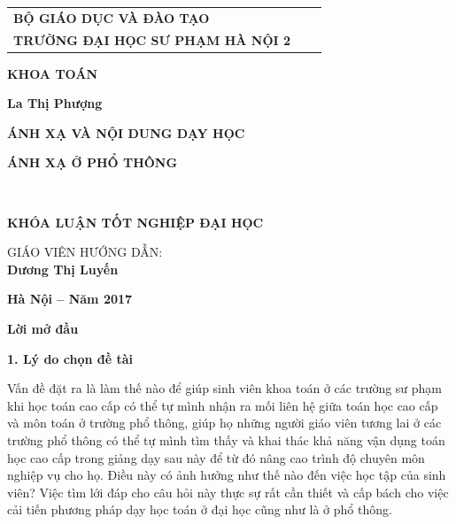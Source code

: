 \documentclass[12pt,oneside,a4paper,reqno]{book}
\begin{document}
\begin{titlepage}
\begin{longtable}{p{4cm}p{2cm}p{7cm}}
\centerline{\bf BỘ GIÁO DỤC VÀ ĐÀO TẠO}\\
\centerline{\bf TRƯỜNG ĐẠI HỌC SƯ PHẠM HÀ NỘI 2}\\

\end{longtable}
\vspace*{2 cm}
\centerline{\large\bf KHOA TOÁN}
\vspace*{2 cm}
\centerline{\large\bf La Thị Phượng}
\vspace*{2cm}
\centerline{\Large\bf ÁNH XẠ VÀ NỘI DUNG DẠY HỌC  }
\centerline{\Large\bf  ÁNH XẠ Ở PHỔ THÔNG}
\vspace*{1cm}
\begin{flushleft}
\hspace*{3.75cm}{\large\bf Chuyên ngành: Đại số}\\
\hspace*{3.75cm}{\large\bf Mã số: ???????}
\end{flushleft}
\vspace*{1cm}
\begin{center}
{\large\bf KHÓA LUẬN TỐT NGHIỆP ĐẠI HỌC}\\
\end{center}
\vspace*{1cm}
\begin{flushright}
GIÁO VIÊN HƯỚNG DẪN:\\
\textbf{Dương Thị Luyến}
\end{flushright}
\vfill
\centerline{\large\bf Hà Nội -- Năm 2017}
\vspace*{0.3cm}
\end{titlepage}

\large
\pagestyle{fancy}
\setcounter{page}{1}
\tableofcontents
\newpage
{}
\vspace*{0.2cm}
\centerline{\Large\bf Lời mở đầu}
\vspace*{0.5cm}
\textbf{1. Lý do chọn đề tài}


Vấn đề đặt ra là làm thế nào để giúp sinh viên khoa toán ở các trường sư phạm khi học toán cao cấp có thể tự mình nhận ra mối liên hệ giữa toán học cao cấp và môn toán ở trường phổ thông, giúp họ những người giáo viên tương lai ở các trường phổ thông có thể tự mình tìm thấy và khai thác khả năng vận dụng toán học cao cấp trong giảng dạy sau này để từ đó nâng cao trình độ chuyên môn nghiệp vụ cho họ. Điều này có ảnh hưởng như thế nào đến việc học tập của sinh viên? Việc tìm lới đáp cho câu hỏi này thực sự rất cần thiết và cấp bách cho việc cải tiến phương pháp dạy học toán ở đại học cũng như là ở phổ thông.
\end{document}
